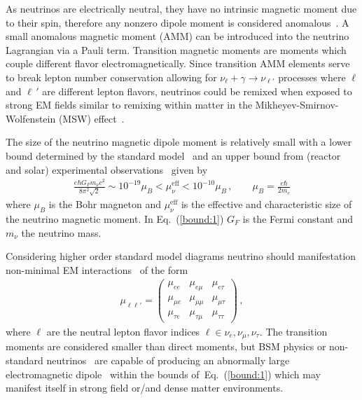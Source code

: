 \documentclass[addchapnum]{ws-rv961x669} %
\newcommand{\req}[1]{Eq.~(\ref{#1})}
\begin{document}
As neutrinos are electrically neutral, they have no intrinsic magnetic moment due to their spin, therefore any nonzero dipole moment is considered anomalous~\cite{Steinmetz:2018ryf}. A small anomalous magnetic moment (AMM) can be introduced into the neutrino Lagrangian via a Pauli term. Transition magnetic moments are moments which couple different flavor electromagnetically. Since transition AMM elements serve to break lepton number conservation allowing for $\nu_{\ell}+\gamma\rightarrow\nu_{\ell'}$ processes where $\ell$ and $\ell\,'$ are different lepton flavors, neutrinos could be remixed when exposed to strong EM fields similar to remixing within matter in the Mikheyev-Smirnov-Wolfenstein (MSW) effect~\citep{Wolfenstein:1977ue,Mikheyev:1985zog}.

The size of the neutrino magnetic dipole moment is relatively small with a lower bound determined by the standard model~\cite{Fujikawa:1980yx,Shrock:1980vy,Shrock:1982sc} and an upper bound from (reactor and solar) experimental observations~\cite{Giunti:2015gga,Canas:2015yoa,Studenikin:2016ykv,AristizabalSierra:2021fuc} given by
\begin{align}
    \label{bound:1}
    \frac{e\hbar G_{F}m_{\nu}c^{2}}{8\pi^{2}\sqrt{2}} \sim 10^{-19}\mu_{B}<\mu_{\nu}^\mathrm{eff}<10^{-10}\mu_{B}\,,\qquad\mu_{B}=\frac{e\hbar}{2m_{e}}
\end{align}
where $\mu_{B}$ is the Bohr magneton and $\mu_{\nu}^\mathrm{eff}$ is the effective and characteristic size of the neutrino magnetic moment. In \req{bound:1} $G_{F}$ is the Fermi constant and $m_{\nu}$ the neutrino mass.

Considering higher order standard model diagrams neutrino should manifestation non-minimal EM interactions~\citep{Giunti:2014ixa} of the form
\begin{align}
    \label{mu:1}
    \mu_{\ell\ell'}=
	\begin{pmatrix}
		\mu_{ee} & \mu_{e\mu} & \mu_{e\tau} \\
		\mu_{\mu e} & \mu_{\mu\mu} & \mu_{\mu\tau} \\
		\mu_{\tau e} & \mu_{\tau\mu} & \mu_{\tau\tau}
	\end{pmatrix}\,,
\end{align}
where $\ell$ are the neutral lepton flavor indices $\ell\in\nu_{e},\nu_{\mu},\nu_{\tau}$. The transition moments are considered smaller than direct moments, but BSM physics or non-standard neutrinos~\cite{Giunti:2014ixa} are capable of producing an abnormally large electromagnetic dipole~\citep{Ohlsson:2012kf,Lindner:2017uvt,Brdar:2020quo} within the bounds of~\req{bound:1} which may manifest itself in strong field or/and dense matter environments.
\end{document}
